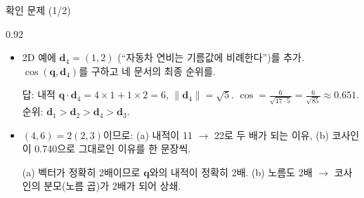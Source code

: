 \begin{frame}{확인 문제 (1/2)}
\begin{center}\begin{varwidth}{0.92\textwidth}
  \small
  \begin{itemize}
    \item {} 2D 예에 $\boldsymbol{d}_{4} = (1, 2)$
      (``자동차 연비는 기름값에 비례한다'')를 추가. \;
      $\cos(\boldsymbol{q}, \boldsymbol{d}_{4})$를 구하고 네 문서의 최종
      순위를.
      \par {\footnotesize 답: 내적 $\boldsymbol{q}\cdot\boldsymbol{d}_{4} =
      4\times1 + 1\times2 = 6$, \; $\|\boldsymbol{d}_{4}\| = \sqrt{5}$. \;
      $\cos = \frac{6}{\sqrt{17 \cdot 5}} = \frac{6}{\sqrt{85}}
      \approx 0.651$. \; 순위: $\boldsymbol{d}_{1} > \boldsymbol{d}_{2} >
      \boldsymbol{d}_{4} > \boldsymbol{d}_{3}$.}
    \item {} $(4,6) = 2(2,3)$이므로: (a) 내적이
      11 $\to$ 22로 두 배가 되는 이유, (b) 코사인이 0.740으로
      그대로인 이유를 한 문장씩.
      \par {\footnotesize (a) 벡터가 정확히 2배이므로 $\boldsymbol{q}$와의
      내적이 정확히 2배. \; (b) 노름도 2배 $\to$ 코사인의 분모(노름
      곱)가 2배가 되어 상쇄.}
  \end{itemize}
\end{varwidth}\end{center}
\end{frame}
